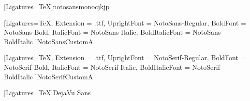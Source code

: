 \ifenabledarabicfont
    \usenotonaskharabictrue
    \usenotosansarabictrue
\fi
\ifusenotonaskharabic
\fi
\ifusenotosansarabic
\fi


      
\ifenabledhebrewfont
{}
\fi

  
\newfontfamily{\NotoSansJPFont}[Ligatures=TeX]{notosansmonocjkjp}

\newfontfamily{\NotoSansFont}[Ligatures=TeX,
Extension = .ttf,
    UprightFont = NotoSans-Regular,
    BoldFont = NotoSans-Bold,
    ItalicFont = NotoSans-Italic,
    BoldItalicFont = NotoSans-BoldItalic
    ]{NotoSansCustomA}
    
\newfontfamily{\NotoSerifFont}[Ligatures=TeX,
Extension = .ttf,
    UprightFont = NotoSerif-Regular,
    BoldFont = NotoSerif-Bold,
    ItalicFont = NotoSerif-Italic,
    BoldItalicFont = NotoSerif-BoldItalic
    ]{NotoSerifCustomA}

\newfontfamily{\DejaVuSansFont}[Ligatures=TeX]{DejaVu Sans}

